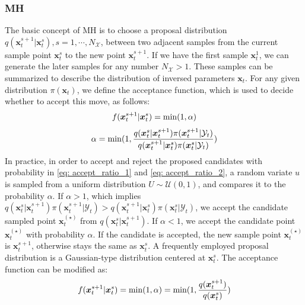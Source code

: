 \subsubsection{\acrfull{MH}}
The basic concept of \acrshort{MH} is to choose a proposal distribution $q(\boldsymbol{x}_{t}^{s+1}|\boldsymbol{x}_{t}^{s}),s=1,\cdots,N_{\mathcal{X}}$, between two adjacent samples from the current sample point $\boldsymbol{x}_{t}^{s}$ to the new point $\boldsymbol{x}_{t}^{s+1}$. If we have the first sample $\boldsymbol{x}_{t}^{1}$, we can generate the later samples for any number $N_{\mathcal{X}} > 1$. These samples can be summarized to describe the distribution of inversed parameters $\boldsymbol{x}_{t}$. For any given distribution $\pi(\boldsymbol{x}_{t})$, we define the acceptance function, which is used to decide whether to accept this move, as follows:
\begin{equation}
    \label{eq: accept_ratio_1}    f(\boldsymbol{x}_{t}^{s+1}|\boldsymbol{x}_{t}^{s})=\rm{min}(1,\alpha)
\end{equation}
\begin{equation}
    \label{eq: accept_ratio_2}    
\alpha = {\rm{min}} (1,
\frac{q(\boldsymbol{x}_{t}^{s}|\boldsymbol{x}_{t}^{s+1})  \pi(\boldsymbol{x}_{t}^{s+1}|\mathcal{Y}_{t})}
{q(\boldsymbol{x}_{t}^{s+1}|\boldsymbol{x}_{t}^{s})   \pi(\boldsymbol{x}_{t}^{s}|\mathcal{Y}_{t})} )
\end{equation}
In practice, in order to accept and reject the proposed candidates with probability in \cref{eq: accept_ratio_1} and \cref{eq: accept_ratio_2}, a random variate $u$ is sampled from a uniform distribution $U \sim \mathcal{U}(0,1)$, and compares it to the probability $\alpha$. If $\alpha > 1$, which implies $q(\boldsymbol{x}_{t}^{s}|\boldsymbol{x}_{t}^{s+1})  \pi(\boldsymbol{x}_{t}^{s+1}|\mathcal{Y}_{t})  > q(\boldsymbol{x}_{t}^{s+1}|\boldsymbol{x}_{t}^{s})   \pi(\boldsymbol{x}_{t}^{s}|\mathcal{Y}_{t})$, we accept the candidate sampled point $\boldsymbol{x}_{t}^{(\star)}$ from $q(\boldsymbol{x}_{t}^{s}|\boldsymbol{x}_{t}^{s+1})$. If $\alpha < 1$, we accept the candidate point $\boldsymbol{x}_{t}^{(\star)}$ with probability $\alpha$. If the candidate is accepted, the new sample point $\boldsymbol{x}_{t}^{(\star)}$ is $\boldsymbol{x}_{t}^{s+1}$, otherwise stays the same as $\boldsymbol{x}_{t}^{s}$. A frequently employed proposal distribution is a Gaussian-type distribution centered at $\boldsymbol{x}_{t}^{s}$. The acceptance function can be modified as:
\begin{equation}
    \label{eq: accept_function_Gaussian_distribution}    
f(\boldsymbol{x}_{t}^{s+1}|\boldsymbol{x}_{t}^{s})={\rm{min}}(1,\alpha)={\rm{min}}(1,\frac{q(\boldsymbol{x}_{t}^{s+1})}
{q(\boldsymbol{x}_{t}^{s})})
\end{equation}
